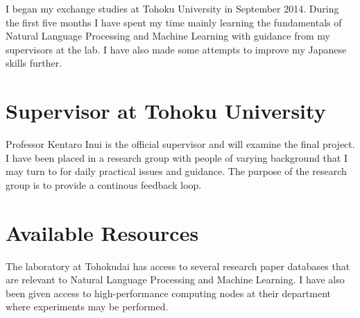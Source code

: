 \documentclass{article}
\begin{document}
I began my exchange studies at Tohoku University in September 2014. During the first five months I have spent my time mainly learning the fundamentals of Natural Language Processing and Machine Learning with guidance from my supervisors at the lab. I have also made some attempts to improve my Japanese skills further.
\section{Supervisor at Tohoku University}
Professor Kentaro Inui is the official supervisor and will examine the final project. I have been placed in a research group with people of varying background that I may turn to for daily practical issues and guidance. The purpose of the research group is to provide a continous feedback loop.

\section{Available Resources}
The laboratory at Tohokudai has access to several research paper databases that are relevant to Natural Language Processing and Machine Learning. I have also been given access to high-performance computing nodes at their department where experiments may be performed.
\end{document}
